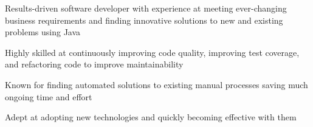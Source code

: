 %
    \begin{itemize*}
        \item Results-driven software developer with experience at meeting ever-changing business requirements
            and finding innovative solutions to new and existing problems using Java
        \item Highly skilled at continuously improving code quality, improving test coverage, and refactoring code to improve maintainability
        \item Known for finding automated solutions to existing manual processes saving much ongoing time and effort
        \item Adept at adopting new technologies and quickly becoming effective with them
    \end{itemize*}
